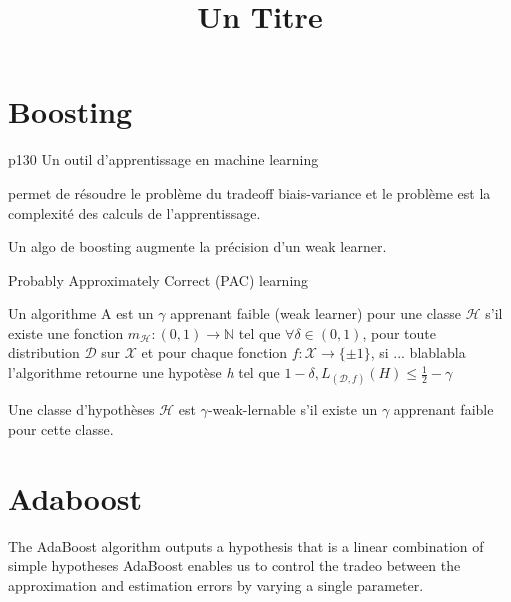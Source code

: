 \documentclass[12pt, a4paper, draft]{article}
\title{Un Titre}
\begin{document}
\maketitle

\section{Boosting}
p130
    Un outil d'apprentissage en machine learning
    
    permet de résoudre le problème du tradeoff biais-variance
    et le problème est la complexité des calculs de l'apprentissage.

    Un algo de boosting augmente la précision d'un weak learner.

    Probably Approximately Correct (PAC) learning
    
    Un algorithme A est un $\gamma$ apprenant faible (weak learner) pour une classe $\mathcal{H}$
    s'il existe une fonction $m_{\mathcal{H}}: (0,1) \rightarrow \mathbb{N}$ tel que 
    $\forall \delta \in (0,1)$, pour toute distribution $\mathcal{D}$ sur $\mathcal{X}$ et pour
    chaque fonction $f:\mathcal{X} \rightarrow \{\pm 1\}$,
    si ... blablabla
    l'algorithme retourne une hypotèse \textit{h} tel que $1- \delta, L_{(\mathcal{D}, f)}(H) \leq
    \frac{1}{2} - \gamma$

    Une classe d'hypothèses $\mathcal{H}$ est $\gamma$-weak-lernable s'il existe un 
    $\gamma$ apprenant faible pour cette classe.





\section{Adaboost}
 The AdaBoost algorithm
outputs a hypothesis that is a linear combination of simple hypotheses
AdaBoost enables us to control the tradeo between the approximation and estimation errors by
varying a single parameter.
\end{document}
